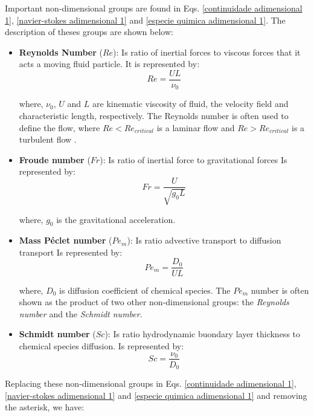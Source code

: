 \newpage
Important non-dimensional groups are found in
Eqs. \ref{continuidade adimensional 1}, \ref{navier-stokes adimensional 1}
and \ref{especie quimica adimensional 1}. 
The description of theses groups are shown below:

\begin{itemize}
 \item \textbf{Reynolds Number} ($Re$): 
 Is ratio of inertial forces to viscous forces that 
 it acts a moving fluid particle.
 It is represented by:
 \begin{equation}
  Re = \frac{UL}{\nu_{0}}
 \end{equation}
 
 where, $\nu_{0}$, $U$ and $L$ are kinematic viscosity of fluid, 
 the velocity field
 and characteristic length, respectively.
 The Reynolds number is often used to define the
 flow, where $Re < Re_{critical}$ is
 a laminar flow and $Re > Re_{critical}$
 is a turbulent flow \cite{fox2012}.

 \item \textbf{Froude number} ($Fr$): 
 Is ratio of inertial force to gravitational forces
 Is represented by:
 \begin{equation}
  Fr = \frac{U}{\sqrt{g_{0}L}}
 \end{equation}
 
 where, $g_{0}$ is the gravitational acceleration.

 \item \textbf{Mass Péclet number} ($Pe_{m}$): 
 Is ratio advective transport to diffusion transport
 Is represented by:
 \begin{equation}
  Pe_{m} = \frac{D_{0}}{UL}
 \end{equation}
 
 where, $D_{0}$ is diffusion coefficient of chemical species.
 The $Pe_{m}$ number is often
 shown as the product of two other non-dimensional groups: 
 the \textit{Reynolds number} and the \textit{Schmidt number}.

 \newpage
 \item \textbf{Schmidt number} ($Sc$): 
 Is ratio hydrodynamic buondary layer thickness to
 chemical species diffusion.
 Is represented by:
 \begin{equation}
  Sc = \frac{\nu_{0}}{D_{0}}
 \end{equation}
\end{itemize}

\medskip
Replacing these non-dimensional groups in Eqs.
\ref{continuidade adimensional 1}, \ref{navier-stokes adimensional 1}
and \ref{especie quimica adimensional 1} and
removing the asterisk, we have:

